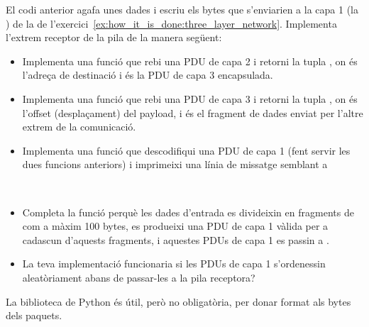 \begin{center}
\end{center}

\begin{exercise}
El codi anterior agafa unes dades i escriu els bytes que s'enviarien a la capa 1 
(la ) de la  de l'exercici~\ref{ex:how_it_is_done:three_layer_network}.
Implementa l'extrem receptor de la pila de la manera següent: 

\begin{itemize}
\item Implementa una funció  que rebi una PDU de capa 2
  i retorni la tupla , on  és l'adreça de destinació i 
   és la PDU de capa 3 encapsulada.\\[-0.25cm]
  
\item Implementa una funció  que rebi una PDU de capa 3
  i retorni la tupla , on  és l'offset (desplaçament) del payload, i 
   és el fragment de dades enviat per l'altre extrem de la comunicació.\\[-0.25cm]
  
\item Implementa una funció  que descodifiqui una PDU de capa 1 (fent servir les dues funcions anteriors)
  i imprimeixi una línia de missatge semblant a 
  \begin{center}
  \end{center}\ \\[-0.75cm]
  
\item Completa la funció  perquè les dades d'entrada es divideixin en fragments de com a màxim 100 bytes, 
      es produeixi una PDU de capa 1 vàlida per a cadascun d'aquests fragments,
      i aquestes PDUs de capa 1 es passin a .\\[-0.25cm]
      
\item La teva implementació funcionaria si les PDUs de capa 1 s'ordenessin aleatòriament abans de passar-les a la pila receptora?
\end{itemize}
% 
\label{ex:how_it_is_done:implementation_three_layer_network}
\end{exercise}

\begin{remark}
La biblioteca  de Python és útil, però no obligatòria, per donar format als bytes dels paquets.
\end{remark}


